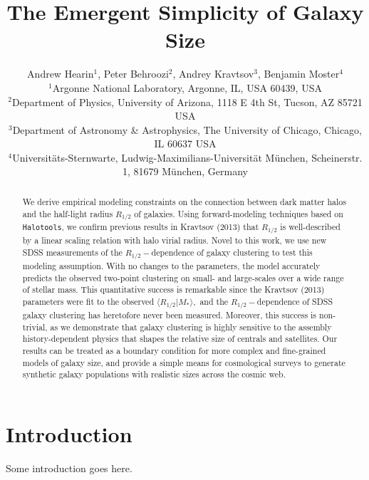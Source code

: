 \documentclass[usenatbib,usegraphicx,letterpaper]{mn2e}
\newcommand{\rhalf}{R_{1/2}}
\newcommand{\mstar}{M_{\ast}}
\begin{document}
\title[The Emergent Simplicity of Galaxy Size]
{The Emergent Simplicity of Galaxy Size}


\author[Hearin, Behroozi, Kravtsov \& Moster]{
Andrew Hearin$^{1}$, Peter Behroozi$^{2}$, Andrey Kravtsov$^{3}$, Benjamin Moster$^{4}$\\
$^{1}$Argonne National Laboratory, Argonne, IL, USA 60439, USA\\
$^{2}$Department of Physics, University of Arizona, 1118 E 4th St, Tucson, AZ 85721 USA\\
$^{3}$Department of Astronomy \& Astrophysics, The University of Chicago, Chicago, IL 60637 USA\\
$^{4}$Universit{\"a}ts-Sternwarte, Ludwig-Maximilians-Universit{\"a}t M{\"u}nchen, Scheinerstr. 1, 81679 M{\"u}nchen, Germany
}

\maketitle

\begin{abstract}
We derive empirical modeling constraints on the connection between dark matter halos and the half-light radius $\rhalf$ of galaxies. Using forward-modeling techniques based on {\tt Halotools}, we confirm previous results in Kravtsov (2013) that $\rhalf$ is well-described by a linear scaling relation with halo virial radius. Novel to this work, we use new SDSS measurements of the $\rhalf-$dependence of galaxy clustering to test this modeling assumption. With no changes to the parameters, the model accurately predicts the observed two-point clustering on small- and large-scales over a wide range of stellar mass. This quantitative success is remarkable since the Kravtsov (2013) parameters were fit to the observed $\langle\rhalf\vert\mstar\rangle,$ and the $\rhalf-$dependence of SDSS galaxy clustering has heretofore never been measured. Moreover, this success is non-trivial, as we demonstrate that galaxy clustering is highly sensitive to the assembly history-dependent physics that shapes the relative size of centrals and satellites. Our results can be treated as a boundary condition for more complex and fine-grained models of galaxy size, and provide a simple means for cosmological surveys to generate synthetic galaxy populations with realistic sizes across the cosmic web.
\end{abstract}

\section{Introduction}
\label{sec:intro}
Some introduction goes here.
\end{document}
